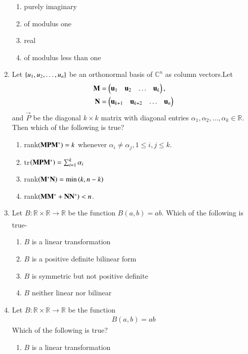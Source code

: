 \begin{enumerate}[label=\thesection.\arabic*.,ref=\thesection.\theenumi]
\begin{enumerate}
\item purely imaginary
\item of modulus one
\item real
\item of modulus less than one
\end{enumerate}  
%
\item Let $\left\{u_1,u_2,\dots, u_n\right\}$ be an orthonormal basis of $\mathbb{C}^n$ as column vectors.Let 
\begin{align}
\mathbf{M} &= \begin{pmatrix}\mathbf{u}_1 & \mathbf{u}_2 & \dots & \mathbf{u}_k\end{pmatrix},
\\
\mathbf{N} &= \begin{pmatrix}\mathbf{u}_{k+1} & \mathbf{u}_{k+2} & \dots & \mathbf{u}_n\end{pmatrix}
\end{align}
%
and $\vec{P}$ be the diagonal $k \times k$ matrix with diagonal entries $\alpha_1,\alpha_2, \dots, \alpha_k \in \mathbb{R}$.  Then which of the following is true?
\begin{enumerate}
\item rank$\left(\mathbf{M}\mathbf{P}\mathbf{M}^*\right) = k$ whenever $\alpha_i \ne \alpha_j, 1 \le i, j \le k$.
\item tr$\left(\mathbf{M}\mathbf{P}\mathbf{M}^*\right) = \sum_{i=1}^{k}\alpha_i$
\item rank$\left(\mathbf{M}^*\mathbf{N}\right) = \min\left(k,n-k\right)$
\item rank$\left(\mathbf{M}\mathbf{M}^*+\mathbf{N}\mathbf{N}^*\right)  < n$.
\end{enumerate}  
%
\solution

\item Let $B: \mathbb{R} \times \mathbb{R} \xrightarrow[]{} \mathbb{R}$ be the function $B(a,b) = ab$. Which of the following is true-
\begin{enumerate}
\item{$B$ is a linear transformation}
\item{$B$ is a positive definite bilinear form}
\item{$B$ is symmetric but not positive definite}
\item{$B$ neither linear nor bilinear}
\end{enumerate}
%
\solution

\item Let $B: \mathbb{R} \times \mathbb{R} \to \mathbb{R}$ be the function
\begin{align}
B(a,b) = ab
\end{align}
Which of the following is true?
\begin{enumerate}
\item $B$ is a linear transformation

\end{enumerate}
\end{enumerate}
